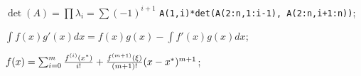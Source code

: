 
\entry
$\det(A) = \prod \lambda_i = \sum (-1)^{i+1}$ \texttt{A(1,i)*det(A(2:n,1:i-1), A(2:n,i+1:n))};

\entry
$\int f(x)g'(x)dx = f(x)g(x) - \int f'(x)g(x)dx$;

\entry
$
f(x) =
\sum_{i=0}^{m} \frac{f^{(i)}(x^{*})}{i!} + \frac{f^{(m+1)}(\xi)}{(m+1)!}(x-x^{*})^{m+1}
$;

